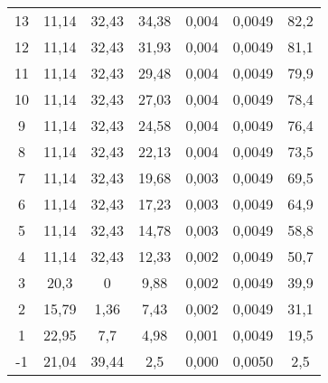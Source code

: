 \begin{table}[H]
{\begin{tabular}{ccccccc}
    13 &
      11,14 &
      32,43 &
      34,38 &
      0,004 &
      0,0049 &
      82,2
      \\
    12 &
      11,14 &
      32,43 &
      31,93 &
      0,004 &
      0,0049 &
      81,1
      \\
    11 &
      11,14 &
      32,43 &
      29,48 &
      0,004 &
      0,0049 &
      79,9
      \\
    10 &
      11,14 &
      32,43 &
      27,03 &
      0,004 &
      0,0049 &
      78,4
      \\
    9 &
      11,14 &
      32,43 &
      24,58 &
      0,004 &
      0,0049 &
      76,4
      \\
    8 &
      11,14 &
      32,43 &
      22,13 &
      0,004 &
      0,0049 &
      73,5
      \\
    7 &
      11,14 &
      32,43 &
      19,68 &
      0,003 &
      0,0049 &
      69,5
      \\
    6 &
      11,14 &
      32,43 &
      17,23 &
      0,003 &
      0,0049 &
      64,9
      \\
    5 &
      11,14 &
      32,43 &
      14,78 &
      0,003 &
      0,0049 &
      58,8
      \\
    4 &
      11,14 &
      32,43 &
      12,33 &
      0,002 &
      0,0049 &
      50,7
      \\
    3 &
      20,3 &
      0 &
      9,88 &
      0,002 &
      0,0049 &
      39,9
      \\
    2 &
      15,79 &
      1,36 &
      7,43 &
      0,002 &
      0,0049 &
      31,1
      \\
    1 &
      22,95 &
      7,7 &
      4,98 &
      0,001 &
      0,0049 &
      19,5
      \\
    -1 &
      21,04 &
      39,44 &
      2,5 &
      0,000 &
      0,0050 &
      2,5
      \bigstrut[b]\\
    \hline
  \end{tabular}}
  \label{sxDD}
\end{table}



